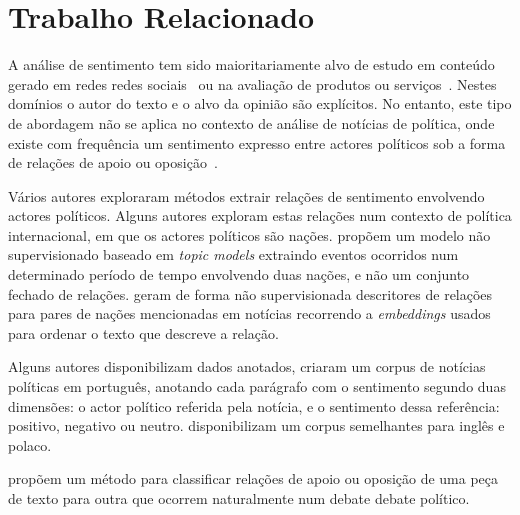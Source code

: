 \documentclass[a4paper, twocolumn, 11pt, twoside]{article}
\begin{document}
\section{Trabalho Relacionado}
\label{sec_related_work}
A análise de sentimento tem sido maioritariamente alvo de estudo em conteúdo gerado em redes redes sociais~\citep{10.1145/3185045} ou na avaliação de produtos ou serviços~\citep{pontiki-etal-2016-semeval}. Nestes domínios o autor do texto e o alvo da opinião são explícitos. No entanto, este tipo de abordagem não se aplica no contexto de análise de notícias de política, onde existe com frequência um sentimento expresso entre actores políticos sob a forma de relações de apoio ou oposição~\citep{balahur2009opinion, balahur-etal-2010-sentiment}.

Vários autores exploraram métodos extrair relações de sentimento envolvendo actores políticos. Alguns autores exploram estas relações num contexto de política internacional, em que os actores políticos são  nações. \cite{oconnor-etal-2013-learning} propõem um modelo não supervisionado baseado em \textit{topic models} extraindo eventos ocorridos num determinado período de tempo envolvendo duas nações, e não um conjunto fechado de relações. \cite{han-etal-2019-permanent} geram de forma não supervisionada descritores de relações para pares de nações mencionadas em notícias recorrendo a \textit{embeddings} usados para ordenar o texto que descreve a relação.

Alguns autores disponibilizam dados anotados, \cite{de-arruda-etal-2015-annotated} criaram um corpus de notícias políticas em português, anotando cada parágrafo com o sentimento segundo duas dimensões: o actor político referida pela notícia, e o sentimento dessa referência: positivo, negativo ou neutro. \cite{BARANIAK20213627} disponibilizam um corpus semelhantes para inglês e polaco.

\cite{cocarascu-toni-2017-identifying} propõem um método para classificar relações de apoio ou oposição de uma peça de texto para outra que ocorrem naturalmente num debate debate político.
\end{document}

